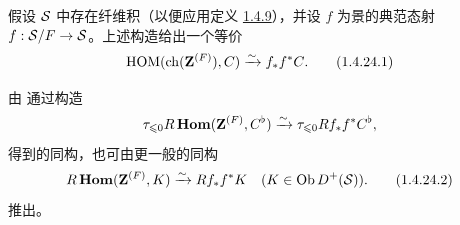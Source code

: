假设 ${\mathcal S}$ 中存在纤维积（以便应用定义 \hyperref[XVIII.subsubsec1.4.9]{1.4.9}），并设 $f$ 为景的典范态射 $f:{\mathcal S}/F\rightarrow {\mathcal S}$。上述构造给出一个等价 \begin{equation*}
\operatorname{HOM}(\operatorname{ch}(\mathbf{Z}^{(F)}),C)\xrightarrow{\sim}
f_{\ast}f^{\ast}C{}.\tag{1.4.24.1}
\end{equation*}

由  通过构造 $$
\tau_{\leqslant 0} R\operatorname{\mathbf{Hom}}(\mathbf{Z}^{(F)},C^{\flat})\xrightarrow{\sim}
\tau_{\leqslant 0} Rf_{\ast} f^{\ast}C^{\flat}{},
$$ 得到的同构\pageoriginale，也可由更一般的同构 \begin{equation*}
R\operatorname{\mathbf{Hom}}(\mathbf{Z}^{(F)},K)\xrightarrow{\sim}
Rf_{\ast}f^{\ast}K\quad (K\in \operatorname{Ob} D^{+}({\mathcal S})){}.\tag{1.4.24.2}
\end{equation*}
推出。

